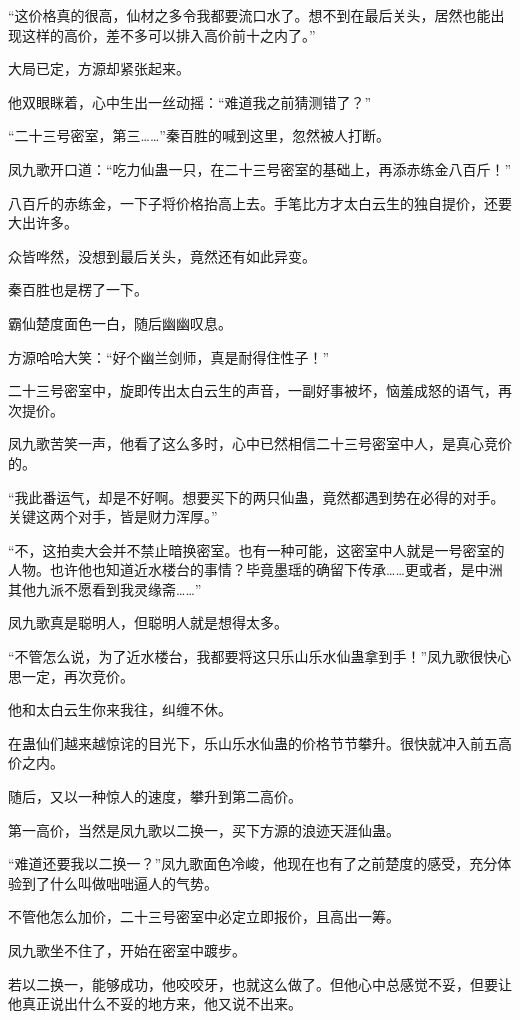 \begin{this_body}
“这价格真的很高，仙材之多令我都要流口水了。想不到在最后关头，居然也能出现这样的高价，差不多可以排入高价前十之内了。”

大局已定，方源却紧张起来。

他双眼眯着，心中生出一丝动摇：“难道我之前猜测错了？”

“二十三号密室，第三……”秦百胜的喊到这里，忽然被人打断。

凤九歌开口道：“吃力仙蛊一只，在二十三号密室的基础上，再添赤练金八百斤！”

八百斤的赤练金，一下子将价格抬高上去。手笔比方才太白云生的独自提价，还要大出许多。

众皆哗然，没想到最后关头，竟然还有如此异变。

秦百胜也是楞了一下。

霸仙楚度面色一白，随后幽幽叹息。

方源哈哈大笑：“好个幽兰剑师，真是耐得住性子！”

二十三号密室中，旋即传出太白云生的声音，一副好事被坏，恼羞成怒的语气，再次提价。

凤九歌苦笑一声，他看了这么多时，心中已然相信二十三号密室中人，是真心竞价的。

“我此番运气，却是不好啊。想要买下的两只仙蛊，竟然都遇到势在必得的对手。关键这两个对手，皆是财力浑厚。”

“不，这拍卖大会并不禁止暗换密室。也有一种可能，这密室中人就是一号密室的人物。也许他也知道近水楼台的事情？毕竟墨瑶的确留下传承……更或者，是中洲其他九派不愿看到我灵缘斋……”

凤九歌真是聪明人，但聪明人就是想得太多。

“不管怎么说，为了近水楼台，我都要将这只乐山乐水仙蛊拿到手！”凤九歌很快心思一定，再次竞价。

他和太白云生你来我往，纠缠不休。

在蛊仙们越来越惊诧的目光下，乐山乐水仙蛊的价格节节攀升。很快就冲入前五高价之内。

随后，又以一种惊人的速度，攀升到第二高价。

第一高价，当然是凤九歌以二换一，买下方源的浪迹天涯仙蛊。

“难道还要我以二换一？”凤九歌面色冷峻，他现在也有了之前楚度的感受，充分体验到了什么叫做咄咄逼人的气势。

不管他怎么加价，二十三号密室中必定立即报价，且高出一筹。

凤九歌坐不住了，开始在密室中踱步。

若以二换一，能够成功，他咬咬牙，也就这么做了。但他心中总感觉不妥，但要让他真正说出什么不妥的地方来，他又说不出来。


\end{this_body}

